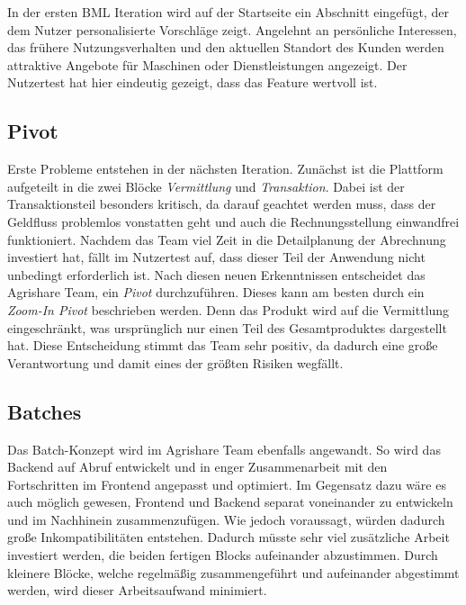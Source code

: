 In der ersten \ac{BML} Iteration wird auf der Startseite ein Abschnitt eingefügt, der dem Nutzer personalisierte Vorschläge zeigt. Angelehnt an persönliche Interessen, das frühere Nutzungsverhalten und den aktuellen Standort des Kunden werden attraktive Angebote für Maschinen oder Dienstleistungen angezeigt. Der Nutzertest hat hier eindeutig gezeigt, dass das Feature wertvoll ist. 

\subsection*{\label{sec:LeanStartup-Umsetzung-Pivot}\thesubsection\quad Pivot}Erste Probleme entstehen in der nächsten Iteration. Zunächst ist die Plattform aufgeteilt in die zwei Blöcke \textit{Vermittlung} und \textit{Transaktion}. Dabei ist der Transaktionsteil besonders kritisch, da darauf geachtet werden muss, dass der Geldfluss problemlos vonstatten geht und auch die Rechnungsstellung einwandfrei funktioniert. Nachdem das Team viel Zeit in die Detailplanung der Abrechnung investiert hat, fällt im Nutzertest auf, dass dieser Teil der Anwendung nicht unbedingt erforderlich ist. Nach diesen neuen Erkenntnissen entscheidet das Agrishare Team, ein \textit{Pivot} durchzuführen. Dieses kann am besten durch ein \textit{Zoom-In Pivot} beschrieben werden. Denn das Produkt wird auf die Vermittlung eingeschränkt, was ursprünglich nur einen Teil des Gesamtproduktes dargestellt hat. Diese Entscheidung stimmt das Team sehr positiv, da dadurch eine große Verantwortung und damit eines der größten Risiken wegfällt. 

\subsection*{\label{sec:LeanStartup-Umsetzung-Batches}\thesubsection\quad Batches}Das Batch-Konzept wird im Agrishare Team ebenfalls angewandt. So wird das Backend auf Abruf entwickelt und in enger Zusammenarbeit mit den Fortschritten im Frontend angepasst und optimiert. Im Gegensatz dazu wäre es auch möglich gewesen, Frontend und Backend separat voneinander zu entwickeln und im Nachhinein zusammenzufügen. Wie \citeauthor{Sprint} jedoch voraussagt, würden dadurch große Inkompatibilitäten entstehen. Dadurch müsste sehr viel zusätzliche Arbeit investiert werden, die beiden fertigen Blocks aufeinander abzustimmen. Durch kleinere Blöcke, welche regelmäßig zusammengeführt und aufeinander abgestimmt werden, wird dieser Arbeitsaufwand minimiert.

